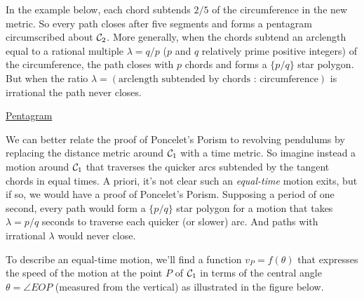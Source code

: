 \documentclass{ximera}
\begin{document}
In the example below, each chord subtends $2/5$ of the circumference in the new metric. So every path closes after five segments and forms a pentagram circumscribed about ${\cal C}_2$. More generally, when the chords subtend an arclength equal to a rational multiple $\lambda = q/p$ ($p$ and $q$ relatively prime positive integers) of the circumference, the path closes with $p$ chords and forms a $\{p/q \}$ star polygon. But when the ratio $\lambda = (\text{arclength subtended by chords : circumference})$ is irrational the path never closes.

\begin{exploration}
\begin{onlineOnly}
    \begin{center}
\end{center}
\end{onlineOnly}

\href{https://www.desmos.com/calculator/qco4rghhfi}{Pentagram}

\end{exploration}

We can better relate the proof of Poncelet's Porism to revolving pendulums by replacing the distance metric around ${\cal C}_1$ with a time metric. So imagine instead a motion around ${\cal C}_1$ that traverses the quicker arcs subtended by the tangent chords in equal times. A priori, it's not clear such an \emph{equal-time} motion exits, but if so, we would have a proof of Poncelet's Porism. Supposing a period of one second, every path would form a $\{p/q \}$ star polygon for a motion that takes $\lambda = p/q$ seconds to traverse each quicker (or slower) arc. And paths with irrational $\lambda$ would never close. 


To describe an equal-time motion, we'll find a function $v_P = f(\theta)$ that expresses the speed of the motion at the point $P$ of ${\cal C}_1$ in terms of the central angle $\theta = \angle EOP$ (measured from the vertical) as illustrated in the figure below.

\begin{onlineOnly}
    \begin{center}
\end{center}
\end{onlineOnly}
\end{document}
